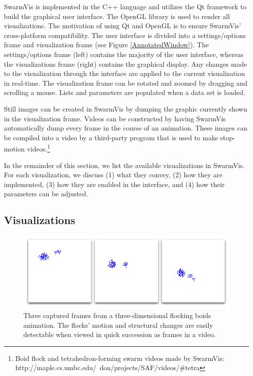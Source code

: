 \documentclass{vgtc}
\begin{document}
SwarmVis is implemented in the C++ language and utilizes the Qt framework\cite{Qt:website} to build the graphical user interface.
The OpenGL library is used to render all visualizations.
The motivation of using Qt and OpenGL is to ensure SwarmVis' cross-platform compatibility.
The user interface is divided into a settings/options frame and visualization frame (see Figure \ref{AnnotatedWindow}).
The settings/options frame (left) contains the majority of the user interface,
whereas the visualizations frame (right) contains  the graphical display.
Any changes made to the visualization through the interface are applied to the current visualization in real-time.
The visualization frame can be rotated and zoomed by dragging and scrolling a mouse.
Lists and parameters are populated when a data set is loaded.

Still images can be created in SwarmVis by dumping the graphic currently shown in the visualization frame.
Videos can be constructed by having SwarmVis automatically dump every frame in the course of an animation.
These images can be compiled into a video by a third-party program that is used to make stop-motion
videos.\footnote{Boid flock and tetrahedron-forming swarm videos made by SwarmVis:\\
 http://maple.cs.umbc.edu/~don/projects/SAF/videos/\#tetra}

In the remainder of this section, we list the available visualizations in SwarmVis.
For each visualization, we discuss
(1) what they convey,
(2) how they are implemented,
(3) how they are enabled in the interface,
and (4) how their parameters can be adjusted.


\subsection{Visualizations}\label{visualizations}


\begin{figure}
\centering
\includegraphics[scale=.29]{images/animation.png}
\caption{
Three captured frames from a three-dimensional flocking boids\cite{reynolds1987} animation.
The flocks' motion and structural changes are easily detectable when viewed in quick succession as frames in a video.}
\label{Animation}
\end{figure}
\end{document}
